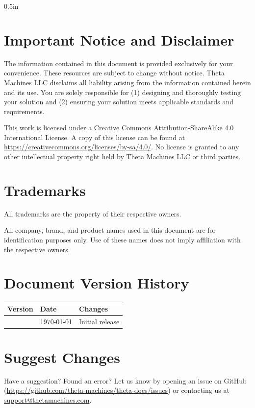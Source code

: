 


\pagestyle{fancy}

\newpage

\begin{newmargin}{0.5in}
    \section*{Important Notice and Disclaimer}
    The information contained in this document is provided exclusively for your convenience. These resources are subject to change without notice. Theta Machines LLC disclaims all liability arising from the information contained herein and its use. You are solely responsible for (1) designing and thoroughly testing your solution and (2) ensuring your solution meets applicable standards and requirements. 

    This work is licensed under a Creative Commons Attribution-ShareAlike 4.0 International License. A copy of this license can be found at \url{https://creativecommons.org/licenses/by-sa/4.0/}. No license is granted to any other intellectual property right held by Theta Machines LLC or third parties.
    
    \section*{Trademarks}
    All trademarks are the property of their respective owners.
    
    All company, brand, and product names used in this document are for identification purposes only. Use of these names does not imply affiliation with the respective owners.

    \section*{Document Version History}
    \begin{tabularx}{\linewidth}{| >{\hsize=0.1\hsize}X | >{\hsize=0.2\hsize}X | >{\hsize=0.7\hsize}X |}
        \hline
        \rowcolor{lightgray!50} 
        \textbf{Version} &
        \textbf{Date} &
        \textbf{Changes} \\
        \hline
        1.0 & \today & Initial release \\
        \hline
    \end{tabularx}

    \vspace{0.5\baselineskip}
    \section*{Suggest Changes}
    Have a suggestion? Found an error? Let us know by opening an issue on GitHub (\url{https://github.com/theta-machines/theta-docs/issues}) or contacting us at \href{mailto:support@thetamachines.com}{support@thetamachines.com}.

\end{newmargin}

